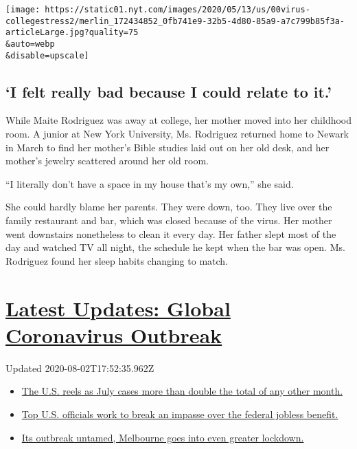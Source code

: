 \texttt{[image: https://static01.nyt.com/images/2020/05/13/us/00virus-collegestress2/merlin\_172434852\_0fb741e9-32b5-4d80-85a9-a7c799b85f3a-articleLarge.jpg?quality=75\\\&auto=webp\\\&disable=upscale]}

\hypertarget{i-felt-really-bad-because-i-could-relate-to-it}{%
\subsection{`I felt really bad because I could relate to
it.'}\label{i-felt-really-bad-because-i-could-relate-to-it}}

While Maite Rodriguez was away at college, her mother moved into her
childhood room. A junior at New York University, Ms. Rodriguez returned
home to Newark in March to find her mother's Bible studies laid out on
her old desk, and her mother's jewelry scattered around her old room.

``I literally don't have a space in my house that's my own,'' she said.

She could hardly blame her parents. They were down, too. They live over
the family restaurant and bar, which was closed because of the virus.
Her mother went downstairs nonetheless to clean it every day. Her father
slept most of the day and watched TV all night, the schedule he kept
when the bar was open. Ms. Rodriguez found her sleep habits changing to
match.

\hypertarget{latest-updates-global-coronavirus-outbreak}{%
\section{\texorpdfstring{\href{https://www.nytimes.com/2020/08/01/world/coronavirus-covid-19.html?action=click\&pgtype=Article\&state=default\&region=MAIN_CONTENT_1\&context=storylines_live_updates}{Latest
Updates: Global Coronavirus
Outbreak}}{Latest Updates: Global Coronavirus Outbreak}}\label{latest-updates-global-coronavirus-outbreak}}

Updated 2020-08-02T17:52:35.962Z

\begin{itemize}
\tightlist
\item
  \href{https://www.nytimes.com/2020/08/01/world/coronavirus-covid-19.html?action=click\&pgtype=Article\&state=default\&region=MAIN_CONTENT_1\&context=storylines_live_updates\#link-34047410}{The
  U.S. reels as July cases more than double the total of any other
  month.}
\item
  \href{https://www.nytimes.com/2020/08/01/world/coronavirus-covid-19.html?action=click\&pgtype=Article\&state=default\&region=MAIN_CONTENT_1\&context=storylines_live_updates\#link-780ec966}{Top
  U.S. officials work to break an impasse over the federal jobless
  benefit.}
\item
  \href{https://www.nytimes.com/2020/08/01/world/coronavirus-covid-19.html?action=click\&pgtype=Article\&state=default\&region=MAIN_CONTENT_1\&context=storylines_live_updates\#link-2bc8948}{Its
  outbreak untamed, Melbourne goes into even greater lockdown.}
\end{itemize}

